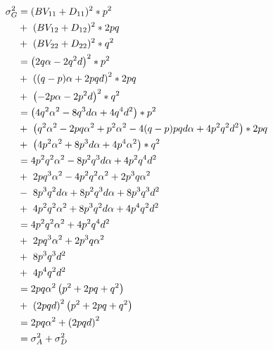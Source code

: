 \documentclass[]{book}
\theoremstyle{definition}
\theoremstyle{definition}
\theoremstyle{definition}
\theoremstyle{remark}
\begin{document}
\begin{align}
\sigma_G^2  &=   (BV_{11} + D_{11})^2 * p^2                                       \notag \\
            &   +\  (BV_{12} + D_{12})^2 * 2pq                                    \notag \\
            &   +\  (BV_{22} + D_{22})^2 * q^2                                    \notag \\
            &=      \left(2q\alpha - 2q^2d   \right)^2 * p^2                      \notag \\
            &   +\  \left((q-p)\alpha + 2pqd \right)^2 * 2pq                      \notag \\
            &   +\  \left(-2p\alpha - 2p^2d  \right)^2 * q^2                      \notag \\
            &=      \left(4q^2\alpha^2 - 8q^3d\alpha + 4q^4d^2  \right) * p^2     \notag \\
            &   +\  \left(q^2\alpha^2 - 2pq\alpha^2 + p^2\alpha^2
                           - 4(q-p)pqd\alpha + 4p^2q^2d^2\right) * 2pq            \notag \\
            &   +\  \left(4p^2\alpha^2 + 8p^3d\alpha + 4p^4\alpha^2 \right) * q^2 \notag \\
            &=      4p^2q^2\alpha^2 - 8p^2q^3d\alpha + 4p^2q^4d^2                 \notag \\
            &   +\  2pq^3\alpha^2 - 4p^2q^2\alpha^2+ 2p^3q\alpha^2                \notag \\
            &   -\  8p^3q^2d\alpha + 8p^2q^3d\alpha + 8p^3q^3d^2                  \notag \\
            &   +\  4p^2q^2\alpha^2 + 8p^3q^2d\alpha + 4p^4q^2d^2                 \notag \\
            &=      4p^2q^2\alpha^2 + 4p^2q^4d^2                                  \notag \\
            &   +\  2pq^3\alpha^2 + 2p^3q\alpha^2                                 \notag \\
            &   +\  8p^3q^3d^2                                                    \notag \\
            &   +\  4p^4q^2d^2                                                    \notag \\
            &=      2pq\alpha^2 \left(p^2 + 2pq + q^2 \right)                     \notag \\
            &   +\  \left(2pqd \right)^2 \left(p^2 + 2pq + q^2 \right)            \notag \\
            &=      2pq\alpha^2 + \left(2pqd \right)^2                            \notag \\
            &=      \sigma_A^2 + \sigma_D^2
\label{eq:GenVarZWD}
\end{align}
\end{document}
